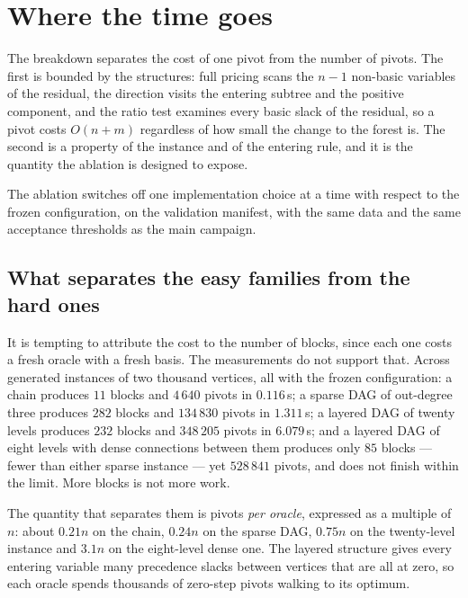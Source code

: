\section{Where the time goes}
\label{sec:analysis}




The breakdown separates the cost of one pivot from the number of pivots. The
first is bounded by the structures: full pricing scans the $n-1$ non-basic
variables of the residual, the direction visits the entering subtree and the
positive component, and the ratio test examines every basic slack of the
residual, so a pivot costs $O(n+m)$ regardless of how small the change to the
forest is. The second is a property of the instance and of the entering rule,
and it is the quantity the ablation is designed to expose.

The ablation switches off one implementation choice at a time with respect to the
frozen configuration, on the validation manifest, with the same data and the same
acceptance thresholds as the main campaign.

\subsection{What separates the easy families from the hard ones}

It is tempting to attribute the cost to the number of blocks, since each one
costs a fresh oracle with a fresh basis. The measurements do not support that.
Across generated instances of two thousand vertices, all with the frozen
configuration: a chain produces $11$ blocks and $4\,640$ pivots in $0.116$\,s;
a sparse DAG of out-degree three produces $282$ blocks and $134\,830$ pivots in
$1.311$\,s; a layered DAG of twenty levels produces $232$ blocks and
$348\,205$ pivots in $6.079$\,s; and a layered DAG of eight levels with dense
connections between them produces only $85$ blocks --- fewer than either sparse
instance --- yet $528\,841$ pivots, and does not finish within the limit. More
blocks is not more work.

The quantity that separates them is pivots \emph{per oracle}, expressed as a
multiple of $n$: about $0.21n$ on the chain, $0.24n$ on the sparse DAG,
$0.75n$ on the twenty-level instance and $3.1n$ on the eight-level dense one.
The layered structure gives every entering variable many precedence slacks
between vertices that are all at zero, so each oracle spends thousands of
zero-step pivots walking to its optimum.

